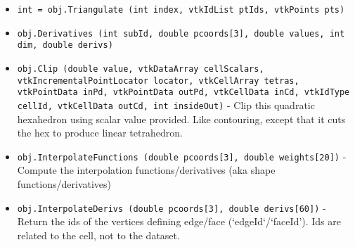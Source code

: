 \begin{itemize}
\item  \verb|int = obj.Triangulate (int index, vtkIdList ptIds, vtkPoints pts)|

\item  \verb|obj.Derivatives (int subId, double pcoords[3], double values, int dim, double derivs)|

\item  \verb|obj.Clip (double value, vtkDataArray cellScalars, vtkIncrementalPointLocator locator, vtkCellArray tetras, vtkPointData inPd, vtkPointData outPd, vtkCellData inCd, vtkIdType cellId, vtkCellData outCd, int insideOut)| -  Clip this quadratic hexahedron using scalar value provided. Like
 contouring, except that it cuts the hex to produce linear
 tetrahedron.

\item  \verb|obj.InterpolateFunctions (double pcoords[3], double weights[20])| -  Compute the interpolation functions/derivatives
 (aka shape functions/derivatives)

\item  \verb|obj.InterpolateDerivs (double pcoords[3], double derivs[60])| -  Return the ids of the vertices defining edge/face (`edgeId`/`faceId').
 Ids are related to the cell, not to the dataset.

\end{itemize}
